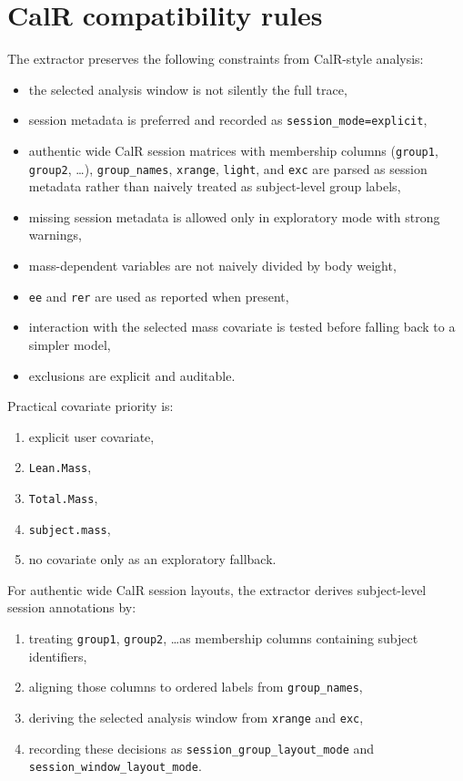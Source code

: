 \documentclass[11pt]{article}
\begin{document}
\section{CalR compatibility rules}
The extractor preserves the following constraints from CalR-style analysis:
\begin{itemize}[leftmargin=2em]
\item the selected analysis window is not silently the full trace,
\item session metadata is preferred and recorded as \texttt{session\_mode=explicit},
\item authentic wide CalR session matrices with membership columns (\texttt{group1}, \texttt{group2}, \ldots), \texttt{group\_names}, \texttt{xrange}, \texttt{light}, and \texttt{exc} are parsed as session metadata rather than naively treated as subject-level group labels,
\item missing session metadata is allowed only in exploratory mode with strong warnings,
\item mass-dependent variables are not naively divided by body weight,
\item \texttt{ee} and \texttt{rer} are used as reported when present,
\item interaction with the selected mass covariate is tested before falling back to a simpler model,
\item exclusions are explicit and auditable.
\end{itemize}

Practical covariate priority is:
\begin{enumerate}[leftmargin=2em]
\item explicit user covariate,
\item \texttt{Lean.Mass},
\item \texttt{Total.Mass},
\item \texttt{subject.mass},
\item no covariate only as an exploratory fallback.
\end{enumerate}

For authentic wide CalR session layouts, the extractor derives subject-level session annotations by:
\begin{enumerate}[leftmargin=2em]
\item treating \texttt{group1}, \texttt{group2}, \ldots as membership columns containing subject identifiers,
\item aligning those columns to ordered labels from \texttt{group\_names},
\item deriving the selected analysis window from \texttt{xrange} and \texttt{exc},
\item recording these decisions as \texttt{session\_group\_layout\_mode} and \texttt{session\_window\_layout\_mode}.
\end{enumerate}
\end{document}
